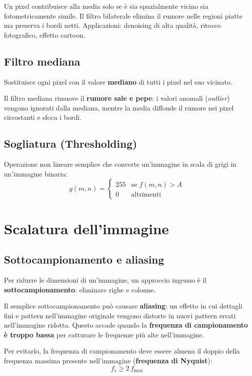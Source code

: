 \documentclass[12pt, a4paper]{report}
\begin{document}
Un pixel contribuisce alla media solo se è sia spazialmente vicino sia
fotometricamente simile.  Il filtro bilaterale elimina il rumore nelle regioni piatte
ma preserva i bordi netti.  Applicazioni: denoising di alta qualità, ritocco
fotografico, effetto cartoon.

\subsection{Filtro mediana}

Sostituisce ogni pixel con il valore \textbf{mediano} di tutti i pixel nel suo
vicinato.

\begin{propbox}
Il filtro mediana rimuove il \textbf{rumore sale e pepe}: i valori anomali
(\emph{outlier}) vengono ignorati dalla mediana, mentre la media diffonde il rumore
nei pixel circostanti e sfoca i bordi.
\end{propbox}

\subsection{Sogliatura (Thresholding)}

Operazione non lineare semplice che converte un'immagine in scala di grigi in
un'immagine binaria:
\[
  g(m,n) = \begin{cases} 255 & \text{se } f(m,n) > A \\ 0 & \text{altrimenti} \end{cases}
\]

\section{Scalatura dell'immagine}

\subsection{Sottocampionamento e aliasing}

Per ridurre le dimensioni di un'immagine, un approccio ingenuo è il
\textbf{sottocampionamento}: eliminare righe e colonne.

\begin{warnbox}[Aliasing]
Il semplice sottocampionamento può causare \textbf{aliasing}: un effetto in cui
dettagli fini e pattern nell'immagine originale vengono distorte in nuovi pattern
errati nell'immagine ridotta.  Questo accade quando la \textbf{frequenza di
campionamento è troppo bassa} per catturare le frequenze più alte nell'immagine.

Per evitarlo, la frequenza di campionamento deve essere almeno il doppio della
frequenza massima presente nell'immagine (\textbf{frequenza di Nyquist}):
\[
  f_s \geq 2\,f_{\max}
\]
\end{warnbox}
\end{document}
